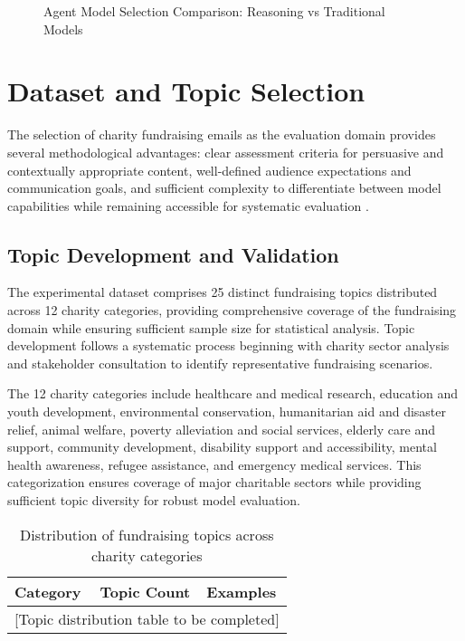 
\begin{figure}[htbp]
    \centering
    \caption{Agent Model Selection Comparison: Reasoning vs Traditional Models}
    \label{fig:agent-model-selection}
\end{figure}

\section{Dataset and Topic Selection}
\label{sec:dataset-topic-selection}

The selection of charity fundraising emails as the evaluation domain provides several methodological advantages: clear assessment criteria for persuasive and contextually appropriate content, well-defined audience expectations and communication goals, and sufficient complexity to differentiate between model capabilities while remaining accessible for systematic evaluation \cite{zhang2019email_subject, pauli2024persuasive_language}.

\subsection{Topic Development and Validation}

The experimental dataset comprises 25 distinct fundraising topics distributed across 12 charity categories, providing comprehensive coverage of the fundraising domain while ensuring sufficient sample size for statistical analysis. Topic development follows a systematic process beginning with charity sector analysis and stakeholder consultation to identify representative fundraising scenarios.

The 12 charity categories include healthcare and medical research, education and youth development, environmental conservation, humanitarian aid and disaster relief, animal welfare, poverty alleviation and social services, elderly care and support, community development, disability support and accessibility, mental health awareness, refugee assistance, and emergency medical services. This categorization ensures coverage of major charitable sectors while providing sufficient topic diversity for robust model evaluation.

\begin{table}[htbp]
    \centering
    \caption{Distribution of fundraising topics across charity categories}
    \label{tab:topic-distribution}
    \begin{tabular}{|l|c|l|}
    \hline
    \textbf{Category} & \textbf{Topic Count} & \textbf{Examples} \\
    \hline
    \multicolumn{3}{|c|}{[Topic distribution table to be completed]} \\
    \hline
    \end{tabular}
\end{table}

